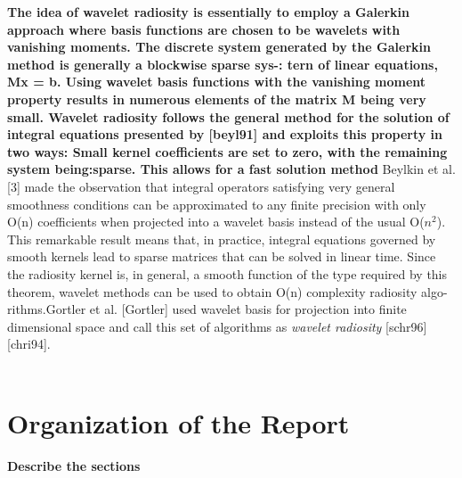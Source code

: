 {\bf The idea of wavelet radiosity is essentially to employ a Galerkin approach where basis functions are chosen to be wavelets with vanishing moments. The discrete system generated by the Galerkin method is generally a blockwise sparse sys-:
tern of linear equations, Mx = b. Using wavelet basis functions with the vanishing moment
property results in numerous elements of the matrix M being very small. Wavelet radiosity
follows the general method for the solution of integral equations presented by [beyl91] and
exploits this property in two ways:
Small kernel coefficients are set to zero, with the remaining system being:sparse. This
allows for a fast solution method} Beylkin et al. [3] made the observation that integral operators satisfying very general smoothness conditions can be approximated to any finite precision with only O(n) coefficients
when projected into a wavelet basis instead of the usual O($n^2$).
This remarkable result means that, in practice, integral equations
governed by smooth kernels lead to sparse matrices that can be
solved in linear time. Since the radiosity kernel is, in general,
a smooth function of the type required by this theorem, wavelet
methods can be used to obtain O(n) complexity radiosity algo-
rithms.Gortler et al. [Gortler] used wavelet basis for projection into finite dimensional space and call this set of algorithms as {\em wavelet radiosity} [schr96][chri94]. \\\\
\section{Organization of the Report}
{\bf Describe the sections}
